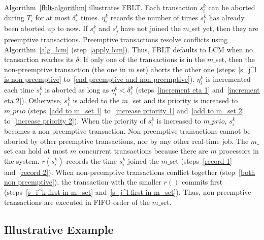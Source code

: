 \documentclass[a4paper,english]{article}
\begin{document}
Algorithm~\ref{fblt-algorithm} illustrates FBLT. Each transaction $s_{i}^{k}$ can be aborted during $T_i$ for at most $\delta_{i}^{k}$ times. $\eta_{i}^{k}$ records  the number of times $s_{i}^{k}$ has already been aborted up to now. If $s_i^k$ and $s_j^l$ have not joined the $m\_$set yet, then they are preemptive transactions. Preemptive transactions resolve conflicts using Algorithm~\ref{alg_lcm} (step~\ref{apply lcm}). Thus, FBLT defaults to LCM when no transaction reaches its $\delta$. If only one of the transactions is in the $m\_$set, then the non-preemptive transaction (the one in $m\_$set) aborts the other one (steps~\ref{s_j^l is non preemptive} to~\ref{end preemptive and non preemptive}). $\eta_i^k$ is incremented each time $s_i^k$ is aborted as long as $\eta_i^k < \delta_i^k$ (steps~\ref{increment eta 1} and~\ref{increment eta 2}). Otherwise, $s_i^k$ is added to the $m\_$ set and its priority is increased to $m\_prio$ (steps~\ref{add to m_set 1} to~\ref{increase priority 1} and~\ref{add to m_set 2} to~\ref{increase priority 2}). When the priority of $s_i^k$ is increased to $m\_prio$, $s_i^k$ becomes a non-preemptive transaction. Non-preemptive transactions cannot be aborted by other preemptive transactions, nor by any other real-time job. The $m\_$set can hold at most $m$ concurrent transactions because there are $m$ processors in the system. $r(s_i^k)$ records the time $s_i^k$ joined the $m\_$set (steps~\ref{record 1} and~\ref{record 2}). When non-preemptive transactions conflict together (step~\ref{both non preemptive}), the transaction with the smaller $r()$ commits first (steps~\ref{s_i^k first in m_set} and~\ref{s_j^l first in m_set}). Thus, non-preemptive transactions are executed in FIFO order of the $m\_$set.

\subsection{Illustrative Example}
\end{document}
